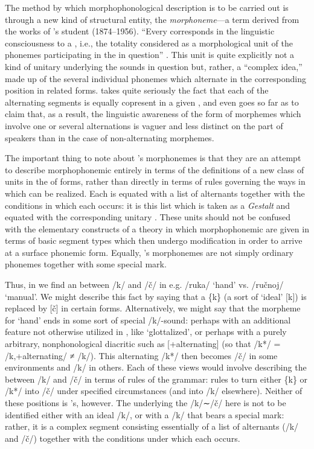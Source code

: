 The method by which morphophonological description is to be carried
out is through a new kind of structural entity, the
\emph{morphoneme}---a term derived from the works of {\Baudouin}'s
student  (1874--1956). ``Every  corresponds in
the linguistic consciousness to a , i.e., the totality
considered as a morphological unit of the phonemes participating in
the  in question''
\citep[30]{trubetzkoy34:russian.morphophonemics}. This unit is quite
explicitly not a kind of unitary  underlying the sounds in
question but, rather, a ``complex idea,'' made up of the several
individual phonemes which alternate in the corresponding position in
related forms. {\Trubetzkoy} takes quite seriously the fact that each of
the alternating segments is equally copresent in a given ,
and even goes so far as to claim that, as a result, the linguistic
awareness of the form of morphemes which involve one or several
alternations is vaguer and less distinct on the part of speakers than
in the case of non-alternating morphemes.

The important thing to note about {\Trubetzkoy}'s morphonemes is that
they are an attempt to describe morphophonemic  entirely in
terms of the definitions of a new class of units in the
 of forms, rather than directly in terms of {rules}
governing the ways in which   can be
realized. Each  is equated with a list of alternants
together with the conditions in which each occurs: it is this list
which is taken as a \emph{Gestalt} and equated with the corresponding
unitary . These units should not be confused with the
elementary constructs of a theory in which morphophonemic
 are given in terms of basic segment types which then
undergo modification in order to arrive at a surface phonemic
form. Equally, {\Trubetzkoy}'s morphonemes are not simply ordinary
phonemes together with some special mark.

Thus, in  we find an  between /k/ and /č/ in
e.g. /ruka/ `hand' vs. /ručnoj/ `manual'. We might describe this fact
by saying that a  \{k\} (a sort of `ideal' [k]) is replaced
by [č] in certain forms. Alternatively, we might say that the morpheme
for `hand' ends in some sort of special /k/-sound: perhaps with an
additional feature not otherwise utilized in , like
`glottalized', or perhaps with a purely arbitrary, nonphonological
diacritic such as [+alternating] (so that /k*/ = /k,+alternating/ ≠
/k/). This alternating /k*/ then becomes /č/ in some environments and
/k/ in others. Each of these views would involve describing the
 between /k/ and /č/ in terms of {rules} of the grammar:
{rules} to turn either \{k\} or /k*/ into /č/ under specified
circumstances (and into /k/ elsewhere). Neither of these positions is
{\Trubetzkoy}'s, however. The  underlying the /k/∼/č/
 here is not to be identified either with an ideal /k/, or
with a /k/ that bears a special mark: rather, it is a complex segment
consisting essentially of a list of alternants (/k/ and /č/) together
with the conditions under which each occurs.

